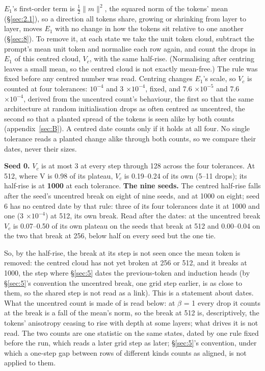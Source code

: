 \documentclass[11pt]{article}
\begin{document}
$E_{1}$'s first-order term is $\tfrac12\|m\|^{2}$, the squared norm of the tokens' mean (\S\ref{sec:2.1}), so a direction all tokens share, growing or shrinking from layer to layer, moves $E_{1}$ with no change in how the tokens sit relative to one another (\S\ref{sec:8}). To remove it, at each state we take the unit token cloud, subtract the prompt's mean unit token and normalise each row again, and count the drops in $E_{1}$ of this centred cloud, $V_c$, with the same half-rise. (Normalising after centring leaves a small mean, so the centred cloud is not exactly mean-free.) The rule was fixed before any centred number was read. Centring changes $E_{1}$'s scale, so $V_c$ is counted at four tolerances: $10^{-4}$ and 3 $\times 10^{-4}$, fixed, and 7.6 $\times 10^{-5}$ and 7.6 $\times 10^{-4}$, derived from the uncentred count's behaviour, the first so that the same architecture at random initialisation drops as often centred as uncentred, the second so that a planted spread of the tokens is seen alike by both counts (appendix~\ref{sec:B}). A centred date counts only if it holds at all four. No single tolerance reads a planted change alike through both counts, so we compare their dates, never their sizes.

\textbf{Seed 0.} $V_c$ is at most 3 at every step through 128 across the four tolerances. At 512, where V is 0.98 of its plateau, $V_c$ is 0.19--0.24 of its own (5--11 drops); its half-rise is at \textbf{1000} at each tolerance. \textbf{The nine seeds.} The centred half-rise falls after the seed's uncentred break on eight of nine seeds, and at 1000 on eight; seed 6 has no centred date by that rule: three of its four tolerances date it at 1000 and one (3 $\times 10^{-4}$) at 512, its own break. Read after the dates: at the uncentred break $V_c$ is 0.07--0.50 of its own plateau on the seeds that break at 512 and 0.00--0.04 on the two that break at 256, below half on every seed but the one tie.

So, by the half-rise, the break at its step is not seen once the mean token is removed: the centred cloud has not yet broken at 256 or 512, and it breaks at 1000, the step where \S\ref{sec:5} dates the previous-token and induction heads (by \S\ref{sec:5}'s convention the uncentred break, one grid step earlier, is as close to them, so the shared step is not read as a link). This is a statement about dates. What the uncentred count is made of is read below: at $\beta $ = 1 every drop it counts at the break is a fall of the mean's norm, so the break at 512 is, descriptively, the tokens' anisotropy ceasing to rise with depth at some layers; what drives it is not read. The two counts are one statistic on the same states, dated by one rule fixed before the run, which reads a later grid step as later; \S\ref{sec:5}'s convention, under which a one-step gap between rows of different kinds counts as aligned, is not applied to them.
\end{document}

